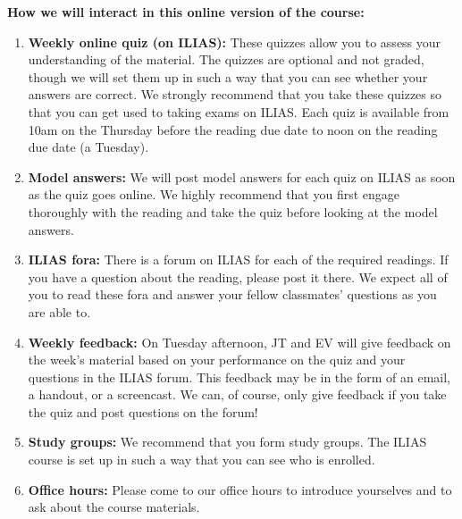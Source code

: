 \documentclass[11pt,fleqn,a4]{article}
\newcommand{\6}{\mbox{$[\hspace*{-.6mm}[$}}
\newcommand{\9}{\mbox{$]\hspace*{-.6mm}]$}}
\begin{document}
{\bf How we will interact in this online version of the course:}

\begin{enumerate}[topsep=-3pt,itemsep=-1pt]

\item {\bf Weekly online quiz (on ILIAS):} These quizzes allow you to assess your understanding of the material. The quizzes are optional and not graded, though we will set them up in such a way that you can see whether your answers are correct. We strongly recommend that you take these quizzes so that you can get used to taking exams on ILIAS. Each quiz is available from 10am on the Thursday before the reading due date to noon on the reading due date (a Tuesday). 

\item {\bf Model answers:} We will post model answers for each quiz on ILIAS as soon as the quiz goes online. We highly recommend that you  first engage thoroughly with the reading and take the quiz before looking at the model answers. 

\item {\bf ILIAS fora:} There is a forum on ILIAS for each of the required readings. If you have a question about the reading, please post it there. We expect all of you to read these fora and answer your fellow classmates' questions as you are able to. 

\item {\bf Weekly feedback:} On Tuesday afternoon, JT and EV will give feedback on the week's material based on your performance on the quiz and your questions in the ILIAS forum. This feedback may be in the form of an email, a handout, or a screencast. We can, of course, only give feedback if you take the quiz and post questions on the forum! 

\item {\bf Study groups:} We recommend that you form study groups. The ILIAS course is set up in such a way that you can see who is enrolled.

\item {\bf Office hours:} Please come to our office hours to introduce yourselves and to ask about the course materials.

\end{enumerate}

\end{document}

